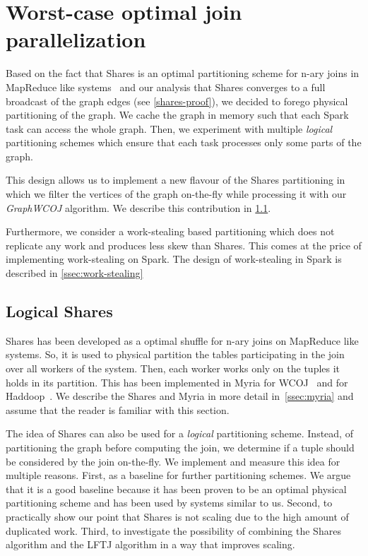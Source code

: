 \section{Worst-case optimal join parallelization}  %

Based on the fact that Shares is an optimal partitioning scheme for n-ary joins in MapReduce like systems~\cite{shares} and
our analysis that Shares converges to a full broadcast of the graph edges (see \cref{shares-proof}), we decided
to forego physical partitioning of the graph.
We cache the graph in memory such that each Spark task can access the whole graph.
Then, we experiment with multiple \textit{logical} partitioning schemes which ensure that each task processes
only some parts of the graph.

This design allows us to implement a new flavour of the Shares partitioning in which we filter the vertices of the
graph on-the-fly while processing it with our \textit{Graph\textsc{WCOJ}} algorithm.
We describe this contribution in \cref{ssec:shares-logical}.

Furthermore, we consider a work-stealing based partitioning which does not replicate any work and produces less
skew than Shares. %
This comes at the price of implementing work-stealing on Spark.
The design of work-stealing in Spark is described in \cref{ssec:work-stealing}

\subsection{Logical Shares} \label{ssec:shares-logical}
Shares has been developed as a optimal shuffle for n-ary joins on MapReduce like systems.
So, it is used to physical partition the tables participating in the join over all workers of the system.
Then, each worker works only on the tuples it holds in its partition.
This has been implemented in Myria for \textsc{WCOJ}~\cite{myria-detailed} and for Haddoop~\cite{TODO}.
We describe the Shares and Myria in more detail in~\cref{ssec:myria} and assume that the reader is familiar
with this section.

The idea of Shares can also be used for a \textit{logical} partitioning scheme.
Instead, of partitioning the graph before computing the join, we determine if a tuple should be considered by the
join on-the-fly.
We implement and measure this idea for multiple reasons.
First, as a baseline for further partitioning schemes.
We argue that it is a good baseline because it has been proven to be an optimal physical partitioning scheme and
has been used by systems similar to us.
Second, to practically show our point that Shares is not scaling due to the high amount of duplicated work.
Third, to investigate the possibility of combining the Shares algorithm and the \textsc{LFTJ} algorithm in
a way that improves scaling.

